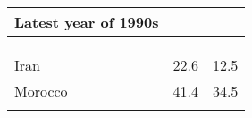 \documentclass[]{book}
\begin{document}
\begin{longtable}[]{@{}lll@{}}
\begin{minipage}[b]{0.29\columnwidth}
Latest year of 1990s\strut
\end{minipage}\tabularnewline
\midrule
\endhead
\begin{minipage}[t]{0.29\columnwidth}\raggedright
\strut
\end{minipage} & \begin{minipage}[t]{0.10\columnwidth}\raggedright
\strut
\end{minipage} & \begin{minipage}[t]{0.29\columnwidth}\raggedright
\strut
\end{minipage}\tabularnewline
\begin{minipage}[t]{0.29\columnwidth}\raggedright
\strut
\end{minipage} & \begin{minipage}[t]{0.10\columnwidth}\raggedright
\strut
\end{minipage} & \begin{minipage}[t]{0.29\columnwidth}\raggedright
\strut
\end{minipage}\tabularnewline
\begin{minipage}[t]{0.29\columnwidth}\raggedright
\strut
\end{minipage} & \begin{minipage}[t]{0.10\columnwidth}\raggedright
\strut
\end{minipage} & \begin{minipage}[t]{0.29\columnwidth}\raggedright
\strut
\end{minipage}\tabularnewline
\begin{minipage}[t]{0.29\columnwidth}\raggedright
Iran\strut
\end{minipage} & \begin{minipage}[t]{0.10\columnwidth}\raggedright
22.6\strut
\end{minipage} & \begin{minipage}[t]{0.29\columnwidth}\raggedright
12.5\strut
\end{minipage}\tabularnewline
\begin{minipage}[t]{0.29\columnwidth}\raggedright
Morocco\strut
\end{minipage} & \begin{minipage}[t]{0.10\columnwidth}\raggedright
41.4\strut
\end{minipage} & \begin{minipage}[t]{0.29\columnwidth}\raggedright
34.5\strut
\end{minipage}\tabularnewline
\begin{minipage}[t]{0.29\columnwidth}\raggedright

\end{minipage}
\end{longtable}
\end{document}
